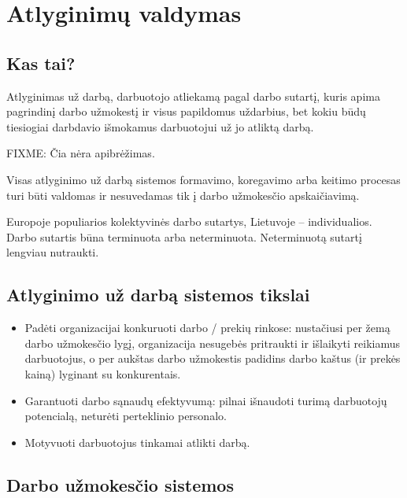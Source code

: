\chapter{Atlyginimų valdymas}

\section{Kas tai?}

\begin{defn}
  Atlyginimas už darbą, darbuotojo atliekamą pagal darbo sutartį,
  kuris apima pagrindinį darbo užmokestį ir visus papildomus
  uždarbius, bet kokiu būdų tiesiogiai darbdavio išmokamus
  darbuotojui už jo atliktą darbą.
\end{defn}

\begin{defn}
  FIXME: Čia nėra apibrėžimas.

  Visas atlyginimo už darbą sistemos formavimo, koregavimo arba
  keitimo procesas turi būti valdomas ir nesuvedamas tik į darbo
  užmokesčio apskaičiavimą.
\end{defn}

Europoje populiarios kolektyvinės darbo sutartys, Lietuvoje – individualios.
Darbo sutartis būna terminuota arba neterminuota. Neterminuotą sutartį
lengviau nutraukti.

\section{Atlyginimo už darbą sistemos tikslai}

\begin{itemize}
  \item Padėti organizacijai konkuruoti darbo / prekių rinkose:
    nustačiusi per žemą darbo užmokesčio lygį, organizacija nesugebės
    pritraukti ir išlaikyti reikiamus darbuotojus, o per aukštas
    darbo užmokestis padidins darbo kaštus (ir prekės kainą) lyginant
    su konkurentais.
  \item Garantuoti darbo sąnaudų efektyvumą: pilnai išnaudoti turimą
    darbuotojų potencialą, neturėti perteklinio personalo.
  \item Motyvuoti darbuotojus tinkamai atlikti darbą.
\end{itemize}

\section{Darbo užmokesčio sistemos}

